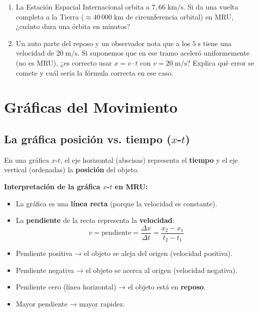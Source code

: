\documentclass[12pt, letterpaper]{article}
\begin{document}
\begin{enumerate}[leftmargin=*, resume]
  \item \dificil{} La Estación Espacial Internacional orbita a $7{,}66\;\text{km/s}$. Si da una vuelta completa a la Tierra ($\approx 40\,000\;\text{km}$ de circunferencia orbital) en MRU, ¿cuánto dura una órbita en minutos?

  \item \dificil{} Un auto parte del reposo y un observador nota que a los $5\;\text{s}$ tiene una velocidad de $20\;\text{m/s}$. Si suponemos que en ese tramo aceleró uniformemente (no es MRU), ¿es correcto usar $x = v \cdot t$ con $v = 20\;\text{m/s}$? Explica qué error se comete y cuál sería la fórmula correcta en ese caso.
\end{enumerate}


\section{Gráficas del Movimiento}

\subsection{La gráfica posición vs. tiempo ($x$-$t$)}

En una gráfica $x$-$t$, el eje horizontal (abscisas) representa el \textbf{tiempo} y el eje vertical (ordenadas) la \textbf{posición} del objeto.

\begin{cuadroteoria}
  \textbf{Interpretación de la gráfica $x$-$t$ en MRU:}
  \begin{itemize}[leftmargin=*]
    \item La gráfica es una \textbf{línea recta} (porque la velocidad es constante).
    \item La \textbf{pendiente} de la recta representa la \textbf{velocidad}:
          $$v = \text{pendiente} = \frac{\Delta x}{\Delta t} = \frac{x_2 - x_1}{t_2 - t_1}$$
    \item Pendiente positiva → el objeto se aleja del origen (velocidad positiva).
    \item Pendiente negativa → el objeto se acerca al origen (velocidad negativa).
    \item Pendiente cero (línea horizontal) → el objeto está en \textbf{reposo}.
    \item Mayor pendiente → mayor rapidez.
  \end{itemize}
\end{cuadroteoria}
\end{document}
